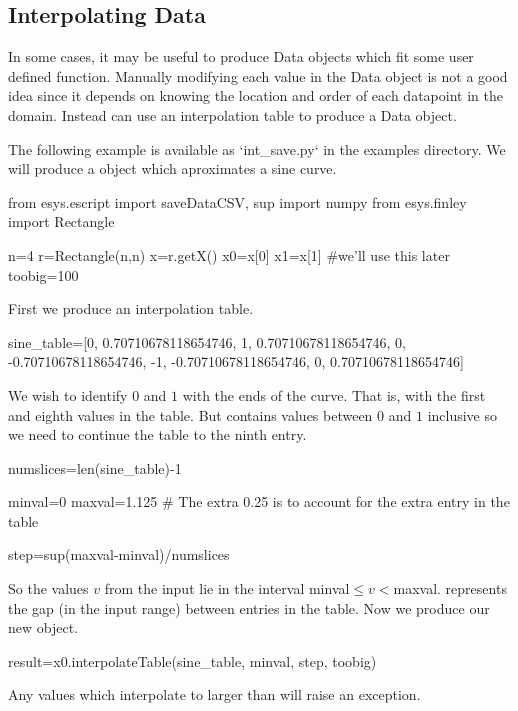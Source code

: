 \subsection{Interpolating Data}
In some cases, it may be useful to produce Data objects which fit some user defined function.
Manually modifying each value in the Data object is not a good idea since it depends on 
knowing the location and order of each datapoint in the domain.
Instead \escript can use an interpolation table to produce a Data object.

The following example is available as `int_save.py` in the examples directory.
We will produce a \Data object which aproximates a sine curve.

\begin{python}
from esys.escript import saveDataCSV, sup
import numpy
from esys.finley import Rectangle

n=4		
r=Rectangle(n,n)
x=r.getX()
x0=x[0]
x1=x[1]    #we'll use this later
toobig=100	
\end{python}

First we produce an interpolation table.
\begin{python}
sine_table=[0, 0.70710678118654746, 1, 0.70710678118654746, 0, 
           -0.70710678118654746, -1, -0.70710678118654746, 0, 
            0.70710678118654746]
\end{python}

We wish to identify $0$ and $1$ with the ends of the curve.
That is, with the first and eighth values in the table. 
But  contains values between $0$ and $1$ inclusive so we need to continue the table to the ninth entry.

\begin{python}
numslices=len(sine_table)-1

minval=0
maxval=1.125	# The extra 0.25 is to account for the extra entry in the table

step=sup(maxval-minval)/numslices
\end{python}

So the values $v$ from the input lie in the interval minval$\leq v < $maxval.
 represents the gap (in the input range) between entries in the table.
Now we produce our new \Data object.

\begin{python}
result=x0.interpolateTable(sine_table, minval, step, toobig)
\end{python}
Any values which interpolate to larger than  will raise an exception.

